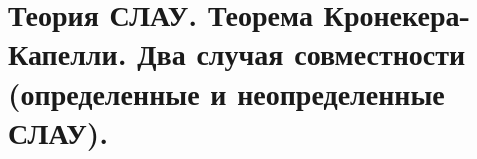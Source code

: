 \section{Теория СЛАУ. Теорема Кронекера-Капелли. Два случая совместности (определенные и неопределенные СЛАУ).}

\pagebreak